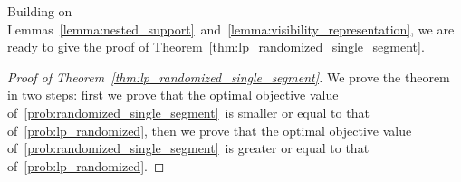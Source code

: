 \documentclass[msom,non-blindrev]{informs3} %
\theoremstyle{definition}
\begin{document}

Building  on Lemmas~\ref{lemma:nested_support}~and~\ref{lemma:visibility_representation}, we are ready to give the proof of Theorem~\ref{thm:lp_randomized_single_segment}.

\begin{proof}[Proof of Theorem~\ref{thm:lp_randomized_single_segment}]
We prove the theorem in two steps: first we prove that the optimal objective value of~\eqref{prob:randomized_single_segment}~is smaller or equal to that of~\eqref{prob:lp_randomized}, then we prove that the optimal objective value of~\eqref{prob:randomized_single_segment}~is greater or equal to that of~\eqref{prob:lp_randomized}.


\end{proof}
\end{document}
